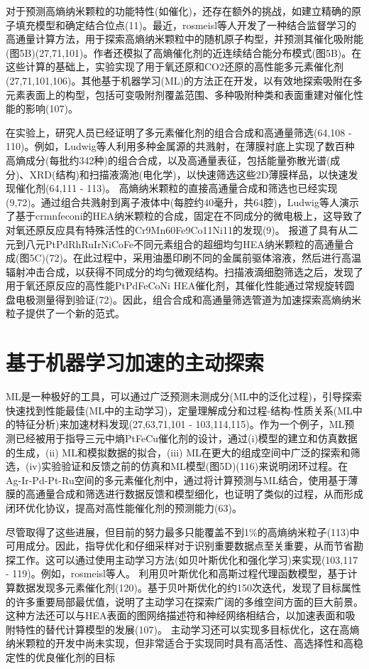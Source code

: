 \documentclass[a4paper]{article}
\begin{document}
对于预测高熵纳米颗粒的功能特性(如催化)，还存在额外的挑战，如建立精确的原子填充模型和确定结合位点(11)。最近，rosmeisl等人开发了一种结合监督学习的高通量计算方法，用于探索高熵纳米颗粒中的随机原子构型，并预测其催化吸附能(图5B)(27,71,101)。作者还模拟了高熵催化剂的近连续结合能分布模式(图5B)。在这些计算的基础上，实验实现了用于氧还原和CO2还原的高性能多元素催化剂(27,71,101,106)。其他基于机器学习(ML)的方法正在开发，以有效地探索吸附在多元素表面上的构型，包括可变吸附剂覆盖范围、多种吸附种类和表面重建对催化性能的影响(107)。



在实验上，研究人员已经证明了多元素催化剂的组合合成和高通量筛选(64,108 - 110)。例如，Ludwig等人利用多种金属源的共溅射，在薄膜衬底上实现了数百种高熵成分(每批约342种)的组合合成，以及高通量表征，包括能量弥散光谱(成分)、XRD(结构)和扫描液滴池(电化学)，以快速筛选这些2D薄膜样品，以快速发现催化剂(64,111 - 113)。
高熵纳米颗粒的直接高通量合成和筛选也已经实现(9,72)。通过组合共溅射到离子液体中(每腔约40毫升，共64腔)，Ludwig等人演示了基于crmnfeconi的HEA纳米颗粒的合成，固定在不同成分的微电极上，这导致了对氧还原反应具有特殊活性的Cr9Mn60Fe9Co11Ni11的发现(9)。
报道了具有从二元到八元PtPdRhRuIrNiCoFe不同元素组合的超细均匀HEA纳米颗粒的高通量合成(图5C)(72)。在此过程中，采用油墨印刷不同的金属前驱体溶液，然后进行高温辐射冲击合成，以获得不同成分的均匀微观结构。扫描液滴细胞筛选之后，发现了用于氧还原反应的高性能PtPdFeCoNi HEA催化剂，其催化性能通过常规旋转圆盘电极测量得到验证(72)。因此，组合合成和高通量筛选管道为加速探索高熵纳米粒子提供了一个新的范式。


\section*{基于机器学习加速的主动探索}
ML是一种极好的工具，可以通过广泛预测未测成分(ML中的泛化过程)，引导探索快速找到性能最佳(ML中的主动学习)，定量理解成分和过程-结构-性质关系(ML中的特征分析)来加速材料发现(27,63,71,101 - 103,114,115)。作为一个例子，ML预测已经被用于指导三元中熵PtFeCu催化剂的设计，通过(i)模型的建立和仿真数据的生成，(ii) ML和模拟数据的拟合，(iii) ML在更大的组成空间中广泛的探索和筛选，(iv)实验验证和反馈之前的仿真和ML模型(图5D)(116)来说明闭环过程。在Ag-Ir-Pd-Pt-Ru空间的多元素催化剂中，通过将计算预测与ML结合，使用基于薄膜的高通量合成和筛选进行数据反馈和模型细化，也证明了类似的过程，从而形成闭环优化协议，提高对高性能催化剂的预测能力(63)。


尽管取得了这些进展，但目前的努力最多只能覆盖不到1\%的高熵纳米粒子(113)中可用成分。因此，指导优化和仔细采样对于识别重要数据点至关重要，从而节省勘探工作。这可以通过使用主动学习方法(如贝叶斯优化和强化学习)来实现(103,117 - 119)。例如，rosmeisl等人。
利用贝叶斯优化和高斯过程代理函数模型，基于计算数据发现多元素催化剂(120)。基于贝叶斯优化的约150次迭代，发现了目标属性的许多重要局部最优值，说明了主动学习在探索广阔的多维空间方面的巨大前景。
这种方法还可以与HEA表面的图网络描述符和神经网络相结合，以加速表面和吸附特性的替代计算模型的发展(107)。
主动学习还可以实现多目标优化，这在高熵纳米颗粒的开发中尚未实现，但非常适合于实现同时具有高活性、高选择性和高稳定性的优良催化剂的目标
\end{document}
